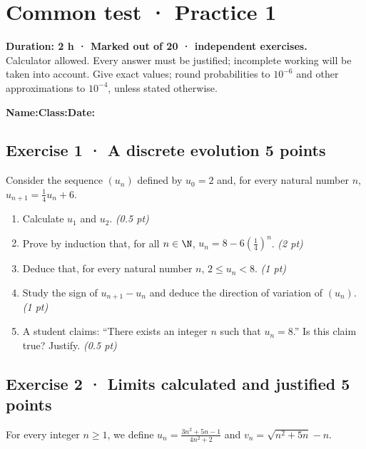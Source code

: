 \mxnewpage{}\label{sujet:3-1}

\section*{Common test · Practice 1}


\textbf{Duration: 2 h · Marked out of 20 ·  independent exercises.}\\Calculator allowed. Every answer must be justified; incomplete working will be taken into account. Give exact values; round probabilities to $10^{-6}$ and other approximations to $10^{-4}$, unless stated otherwise.

\smallskip\textbf{Name:}\enspace\dotfill\quad\textbf{Class:}\enspace\dotfill\quad\textbf{Date:}\enspace\dotfill

\subsection*{Exercise 1 · A discrete evolution \hfill 5 points}Consider the sequence $(u_n)$ defined by $u_0=2$ and, for every natural number $n$, $u_{n+1}=\frac{1}{4}u_n+6$.

\begin{enumerate}

\item Calculate $u_1$ and $u_2$. \hfill\textit{(0.5 pt)}

\item Prove by induction that, for all $n\in\N$, $u_n=8-6\left(\frac{1}{4}\right)^n$. \hfill\textit{(2 pt)}

\item Deduce that, for every natural number $n$, $2\le u_n<8$. \hfill\textit{(1 pt)}

\item Study the sign of $u_{n+1}-u_n$ and deduce the direction of variation of $(u_n)$. \hfill\textit{(1 pt)}

\item A student claims: ``There exists an integer $n$ such that $u_n=8$.'' Is this claim true? Justify. \hfill\textit{(0.5 pt)}

\end{enumerate}

\subsection*{Exercise 2 · Limits calculated and justified \hfill 5 points}For every integer $n\ge1$, we define $u_n=\frac{3n^2+5n-1}{4n^2+2}$ and $v_n=\sqrt{n^2+5n}-n$.

